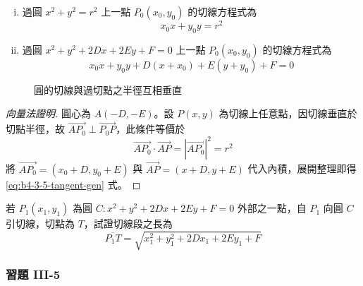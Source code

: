 \begin{theorem}[過圓上一點之切線方程式]
\begin{enumerate}[(i)]
  \item 過圓 $x^2 + y^2 = r^2$ 上一點 $P_0(x_0, y_0)$ 的切線方程式為
  \[ x_0 x + y_0 y = r^2 \]
  \item 過圓 $x^2 + y^2 + 2Dx + 2Ey + F = 0$ 上一點 $P_0(x_0, y_0)$ 的切線方程式為
  \begin{equation}
  x_0 x + y_0 y + D(x + x_0) + E(y + y_0) + F = 0 \label{eq:b4-3-5-tangent-gen}
  \end{equation}
\end{enumerate}
\end{theorem}

\begin{figure}[htbp]
\centering
{}
\caption{圓的切線與過切點之半徑互相垂直}
\label{fig:b4-3-36}
\end{figure}

\begin{proof}[向量法證明]
圓心為 $A(-D, -E)$。設 $P(x,y)$ 為切線上任意點，因切線垂直於切點半徑，故 $\vec{AP_0} \perp \vec{P_0P}$，此條件等價於
\[ \vec{AP_0} \cdot \vec{AP} = |\vec{AP_0}|^2 = r^2 \]
將 $\vec{AP_0} = (x_0 + D, y_0 + E)$ 與 $\vec{AP} = (x + D, y + E)$ 代入內積，展開整理即得 \eqref{eq:b4-3-5-tangent-gen} 式。
\end{proof}

\begin{exercise}
若 $P_1(x_1, y_1)$ 為圓 $C : x^2 + y^2 + 2Dx + 2Ey + F = 0$ 外部之一點，自 $P_1$ 向圓 $C$ 引切線，切點為 $T$，試證切線段之長為
\[ \overline{P_1T} = \sqrt{x_1^2 + y_1^2 + 2Dx_1 + 2Ey_1 + F} \]
\end{exercise}

\subsubsection*{習題 III-5}

